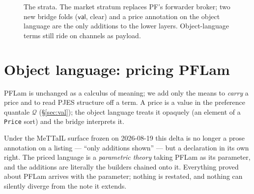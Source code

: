 \documentclass[11pt]{article}
\theoremstyle{definition}
\newcommand{\PF}{\textsf{PF}}
\newcommand{\CDT}{\textsf{CDT}}
\newcommand{\PFLam}{\textsf{PFLam}}
\newcommand{\holes}{\textsf{holes}}
\newcommand{\grounded}{\textsf{grounded}}
\newcommand{\val}{\ensuremath{\mathsf{val}}}
\newcommand{\Qval}{\mathcal{Q}}            %
\newcommand{\modelsT}{\models}
\newcommand{\plug}[3]{#1 \mathbin{\triangleleft_{#2}} #3}
\newcommand{\clear}{\textsf{clear}}
\begin{document}
\begin{figure}[h]
\centering
{}
\caption{The strata. The market stratum replaces \PF{}'s forwarder broker; two new bridge folds
(\val, \clear) and a price annotation on the object language are the only additions to the lower
layers. Object-language terms still ride on channels as payload.}
\label{fig:strata}
\end{figure}

\section{Object language: pricing \PFLam{}}\label{sec:lang}
\PFLam{} is unchanged as a calculus of meaning; we add only the means to \emph{carry} a price and to
read PJES structure off a term. A price is a value in the preference quantale $\Qval$
(\S\ref{sec:val}); the object language treats it opaquely (an element of a \texttt{Price} sort) and
the bridge interprets it.

Under the MeTTaIL surface frozen on 2026-08-19 this delta is no longer a prose annotation on a
listing --- ``only additions shown'' --- but a declaration in its own right. The priced language is a
\emph{parametric theory} taking \PFLam{} as its parameter, and the additions are literally the
builders chained onto it. Everything proved about \PFLam{} arrives with the parameter; nothing is
restated, and nothing can silently diverge from the note it extends.
\end{document}
